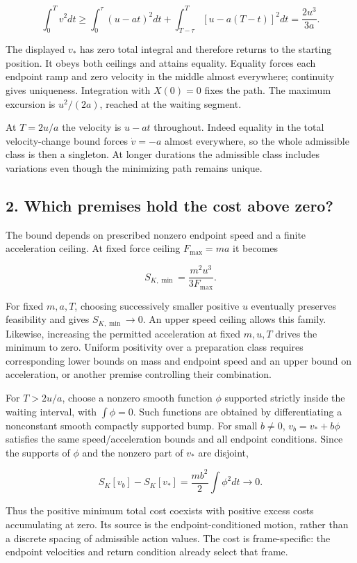 \documentclass[11pt,a4paper]{article}
\begin{document}
\[
\int_0^T v^2dt\ge
\int_0^\tau(u-at)^2dt+
\int_{T-\tau}^T[u-a(T-t)]^2dt=\frac{2u^3}{3a}.
\]

The displayed \(v_*\) has zero total integral and therefore returns to
the starting position. It obeys both ceilings and attains equality.
Equality forces each endpoint ramp and zero velocity in the middle
almost everywhere; continuity gives uniqueness. Integration with
\(X(0)=0\) fixes the path. The maximum excursion is \(u^2/(2a)\),
reached at the waiting segment.

At \(T=2u/a\) the velocity is \(u-at\) throughout. Indeed equality in
the total velocity-change bound forces \(\dot v=-a\) almost everywhere,
so the whole admissible class is then a singleton. At longer durations
the admissible class includes variations even though the minimizing path
remains unique.

\hypertarget{which-premises-hold-the-cost-above-zero}{%
\subsection{2. Which premises hold the cost above
zero?}\label{which-premises-hold-the-cost-above-zero}}

The bound depends on prescribed nonzero endpoint speed and a finite
acceleration ceiling. At fixed force ceiling \(F_{\max}=ma\) it becomes

\[
S_{K,\min}=\frac{m^2u^3}{3F_{\max}}.
\]

For fixed \(m,a,T\), choosing successively smaller positive \(u\)
eventually preserves feasibility and gives \(S_{K,\min}\to0\). An upper
speed ceiling allows this family. Likewise, increasing the permitted
acceleration at fixed \(m,u,T\) drives the minimum to zero. Uniform
positivity over a preparation class requires corresponding lower bounds
on mass and endpoint speed and an upper bound on acceleration, or
another premise controlling their combination.

For \(T>2u/a\), choose a nonzero smooth function \(\phi\) supported
strictly inside the waiting interval, with \(\int\phi=0\). Such
functions are obtained by differentiating a nonconstant smooth compactly
supported bump. For small \(b\ne0\), \(v_b=v_*+b\phi\) satisfies the
same speed/acceleration bounds and all endpoint conditions. Since the
supports of \(\phi\) and the nonzero part of \(v_*\) are disjoint,

\[
S_K[v_b]-S_K[v_*]=\frac{mb^2}{2}\int\phi^2dt\longrightarrow0.
\]

Thus the positive minimum total cost coexists with positive excess costs
accumulating at zero. Its source is the endpoint-conditioned motion,
rather than a discrete spacing of admissible action values. The cost is
frame-specific: the endpoint velocities and return condition already
select that frame.
\end{document}
